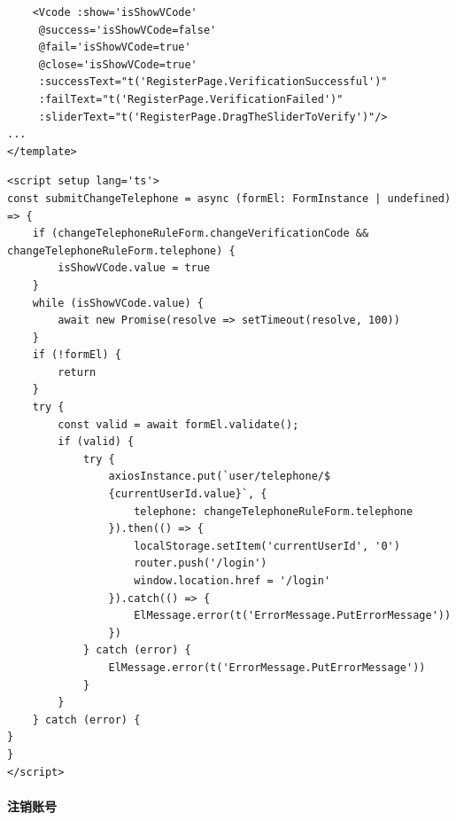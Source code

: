\begin{itemize}
\begin{verbatim}
	<Vcode :show='isShowVCode'
     @success='isShowVCode=false'
     @fail='isShowVCode=true'
     @close='isShowVCode=true'
     :successText="t('RegisterPage.VerificationSuccessful')"
     :failText="t('RegisterPage.VerificationFailed')"
     :sliderText="t('RegisterPage.DragTheSliderToVerify')"/>
...
</template>
	\end{verbatim}
	
	\begin{verbatim}
<script setup lang='ts'>
const submitChangeTelephone = async (formEl: FormInstance | undefined) => {
	if (changeTelephoneRuleForm.changeVerificationCode && changeTelephoneRuleForm.telephone) {
		isShowVCode.value = true
	}
	while (isShowVCode.value) {
		await new Promise(resolve => setTimeout(resolve, 100))
	}
	if (!formEl) {
		return
	}
	try {
		const valid = await formEl.validate();
		if (valid) {
			try {
				axiosInstance.put(`user/telephone/$
				{currentUserId.value}`, {
					telephone: changeTelephoneRuleForm.telephone
				}).then(() => {
					localStorage.setItem('currentUserId', '0')
					router.push('/login')
					window.location.href = '/login'
				}).catch(() => {
					ElMessage.error(t('ErrorMessage.PutErrorMessage'))
				})
			} catch (error) {
				ElMessage.error(t('ErrorMessage.PutErrorMessage'))
			}
		}
	} catch (error) {
}
}
</script>
	\end{verbatim}

\end{itemize}

\paragraph{注销账号}


